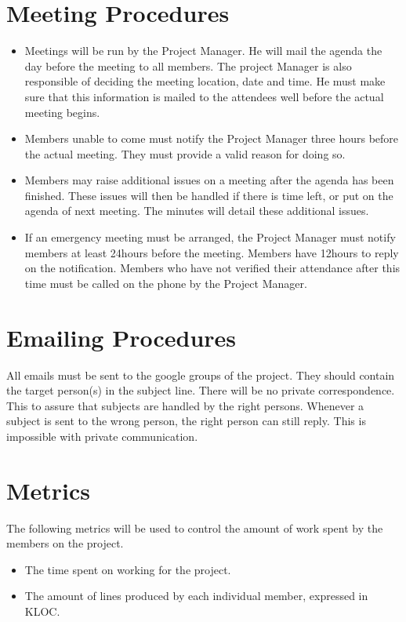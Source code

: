 \documentclass[salesmen, twoside]{../../../templates/latex/2009/softproj}
\begin{document}
\begin{projdoc}
\section{Meeting Procedures}
\begin{itemize}
\item
Meetings will be run by the Project Manager. He will mail the agenda the day before the meeting to all members. The project Manager is also responsible of deciding the meeting location, date and time. He must make sure that this information is mailed to the attendees well before the actual meeting begins.
\item
Members unable to come must notify the Project Manager three hours before the actual meeting. They must provide a valid reason for doing so.
\item
Members may raise additional issues on a meeting after the agenda has been finished. These issues will then be handled if there is time left, or put on the agenda of next meeting. The minutes will detail these additional issues.
\item
If an emergency meeting must be arranged, the Project Manager must notify members at least 24hours before the meeting. Members have 12hours to reply on the notification. Members who have not verified their attendance after this time must be called on the phone by the Project Manager.
\end{itemize}

\section{Emailing Procedures}
All emails must be sent to the google groups of the project. They should contain the target person(s) in the subject line. There will be no private correspondence. This to assure that subjects are handled by the right persons. Whenever a subject is sent to the wrong person, the right person can still reply. This is impossible with private communication.

\section{Metrics}
The following metrics will be used to control the amount of work spent by the members on the project.
\begin{itemize}
\item The time spent on working for the project.
\item The amount of lines produced by each individual member, expressed in KLOC.
\end{itemize}


\end{projdoc}
\end{document}
